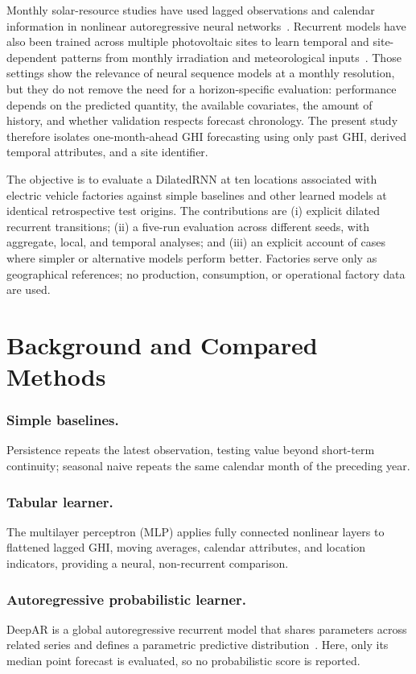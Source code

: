 \documentclass[runningheads]{llncs}
\begin{document}
Monthly solar-resource studies have used lagged observations and calendar information in nonlinear autoregressive neural networks~\cite{ozoegwu2019}. Recurrent models have also been trained across multiple photovoltaic sites to learn temporal and site-dependent patterns from monthly irradiation and meteorological inputs~\cite{jung2020}. Those settings show the relevance of neural sequence models at a monthly resolution, but they do not remove the need for a horizon-specific evaluation: performance depends on the predicted quantity, the available covariates, the amount of history, and whether validation respects forecast chronology. The present study therefore isolates one-month-ahead GHI forecasting using only past GHI, derived temporal attributes, and a site identifier.

The objective is to evaluate a DilatedRNN at ten locations associated with electric vehicle factories against simple baselines and other learned models at identical retrospective test origins. The contributions are (i) explicit dilated recurrent transitions; (ii) a five-run evaluation across different seeds, with aggregate, local, and temporal analyses; and (iii) an explicit account of cases where simpler or alternative models perform better. Factories serve only as geographical references; no production, consumption, or operational factory data are used.

\section{Background and Compared Methods}
\label{sec:background}

\subsubsection{Simple baselines.}
Persistence repeats the latest observation, testing value beyond short-term continuity; seasonal naive repeats the same calendar month of the preceding year.

\subsubsection{Tabular learner.}
The multilayer perceptron (MLP) applies fully connected nonlinear layers to flattened lagged GHI, moving averages, calendar attributes, and location indicators, providing a neural, non-recurrent comparison.

\subsubsection{Autoregressive probabilistic learner.}
DeepAR is a global autoregressive recurrent model that shares parameters across related series and defines a parametric predictive distribution~\cite{salinas2020}. Here, only its median point forecast is evaluated, so no probabilistic score is reported.
\end{document}
